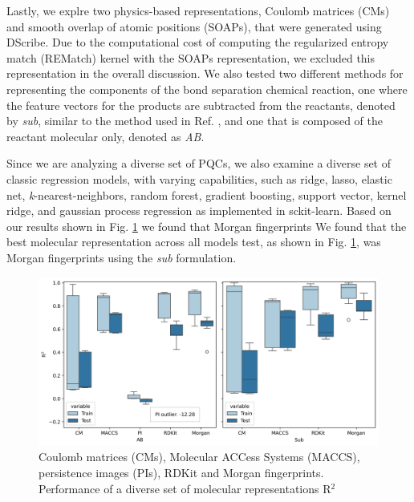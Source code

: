 \documentclass[journal=jacsat,manuscript=article]{achemso}
\begin{document}
Lastly, we explre two physics-based representations, Coulomb matrices (CMs) \cite{rupp_fast_2012} and smooth overlap of atomic positions (SOAPs), that were generated using DScribe.\cite{de_comparing_2016}
Due to the computational cost of computing the regularized entropy match (REMatch) kernel  with the SOAPs representation, we excluded this representation in the overall discussion.
We  also tested two different methods for representing the components of the bond separation chemical reaction, one where the feature vectors for the products are subtracted from the reactants, denoted by \textit{sub}, similar to the method used in Ref. \cite{garcia-andrade_barrier_2023}, and one that is composed of the reactant molecular only, denoted as \textit{AB}.


Since we are analyzing a diverse set of PQCs, we also examine a diverse set of classic regression models, with varying capabilities, such as ridge, lasso, elastic net, \textit{k}-nearest-neighbors, random forest, gradient boosting, support vector, kernel ridge, and gaussian process regression as implemented in sckit-learn.\cite{pedregosa_scikit-learn_2011}
Based on our results shown in Fig. \ref{fig:classical_molrepfig} we found that Morgan fingerprints
We found that the best molecular representation across all models test, as shown in Fig. \ref{fig:classical_molrepfig}, was Morgan fingerprints using the \textit{sub} formulation.
 
\begin{figure}[H]
	\centering	
	\includegraphics[width=\linewidth]{../images/BSE/classical/classical_molrepfig.png}
	\caption{Coulomb matrices (CMs), Molecular ACCess Systems (MACCS), persistence images (PIs), RDKit and Morgan fingerprints. Performance of a diverse set of molecular representations R$^{2}$}
	\label{fig:classical_molrepfig}
\end{figure}
\end{document}
